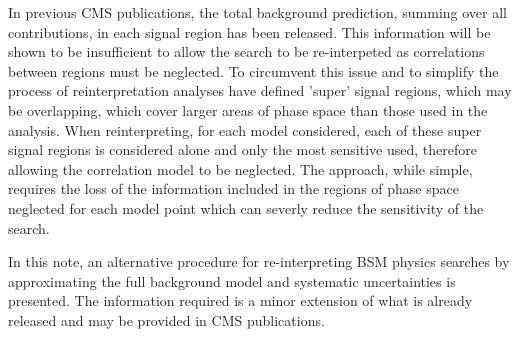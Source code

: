 In previous CMS publications, the total background prediction, summing over all contributions, 
in each signal region has been released. This information will be shown to be insufficient
to allow the search to be re-interpeted as correlations between regions must be neglected.
To circumvent this issue and to simplify the process of reinterpretation analyses have defined 
'super' signal regions, which may be overlapping, which cover larger areas of phase space than those
used in the analysis. When reinterpreting, for each model considered, each of these super signal regions 
is considered alone and only the most sensitive used, therefore allowing the correlation model to be neglected.
The approach, while simple, requires the loss of the information included in the regions of phase
space neglected for each model point which can severly reduce the sensitivity of the search. 

In this note, an alternative procedure for re-interpreting BSM physics searches by approximating
the full background model and systematic uncertainties is presented. The information 
required is a minor extension of what is already released and may be provided in CMS publications.



